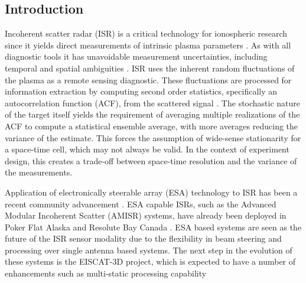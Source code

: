 \documentclass[draft,ras]{agutex}
\begin{document}
%
%

%

\begin{article}

\section{Introduction}
Incoherent scatter radar (ISR) is a critical technology for ionospheric research since it yields direct measurements of intrinsic plasma parameters  \citep{dougherty:farley1960, farleydougherty:ISR2, doughteryfarley:ISR3, hagfors1961}. As with all diagnostic tools it has unavoidable measurement uncertainties, including temporal and spatial ambiguities \citep{farley1969,farleycomppower1969,Woodman:1991is,hysell2008,RDS:RDS20236}.  ISR uses the inherent random fluctuations of the plasma as a remote sensing diagnostic. These fluctuations are processed for information extraction by computing second order statistics, specifically an autocorrelation function (ACF), from the scattered signal \citep{farley1969}. The stochastic nature of the target itself yields the requirement of averaging multiple realizations of the ACF to compute a statistical ensemble average, with more averages reducing the variance of the estimate. This forces the assumption of wide-sense stationarity for a space-time cell, which may not always be valid. In the context of experiment design, this creates a trade-off between space-time resolution and the variance of the measurements.

Application of electronically steerable array (ESA) technology to ISR has been a recent community advancement \citep{kelly:pfisr2009}. ESA capable ISRs, such as the Advanced Modular Incoherent Scatter (AMISR) systems, have already been deployed in Poker Flat Alaska and Resolute Bay Canada \citep{Nicolls:2007ie, dahlgren2012di}. ESA based systems are seen as the future of the ISR sensor modality due to the flexibility in beam steering and processing over single antenna based systems. The next step in the evolution of these systems is the EISCAT-3D project, which is expected to have a number of enhancements such as multi-static processing capability \citep{turunen:eiscat3d2009}


\end{article}
\end{document}
